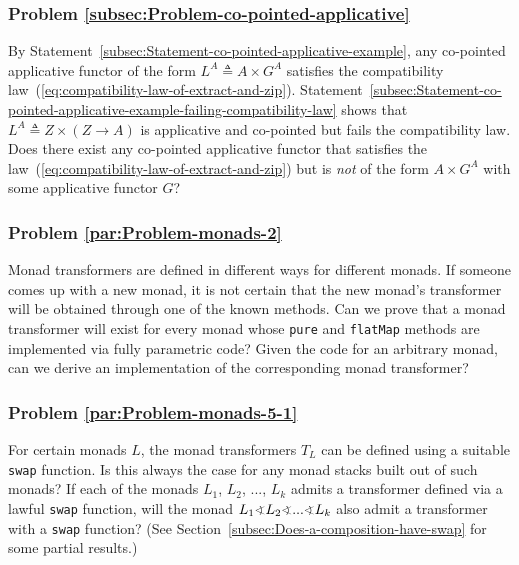 \subsubsection{Problem \label{subsec:Problem-co-pointed-applicative}\ref{subsec:Problem-co-pointed-applicative}}

By Statement~\ref{subsec:Statement-co-pointed-applicative-example},
any co-pointed applicative functor of the form $L^{A}\triangleq A\times G^{A}$
satisfies the compatibility law~(\ref{eq:compatibility-law-of-extract-and-zip}).
Statement~\ref{subsec:Statement-co-pointed-applicative-example-failing-compatibility-law}
shows that $L^{A}\triangleq Z\times\left(Z\rightarrow A\right)$ is
applicative and co-pointed but fails the compatibility law. Does there
exist any co-pointed applicative functor that satisfies the law~(\ref{eq:compatibility-law-of-extract-and-zip})
but is \emph{not} of the form $A\times G^{A}$ with some applicative
functor $G$? 

\subsubsection{Problem \label{par:Problem-monads-2}\ref{par:Problem-monads-2}}

Monad transformers are defined in different ways for different monads.
If someone comes up with a new monad, it is not certain that the new
monad\textsf{'}s transformer will be obtained through one of the known methods.
Can we prove that a monad transformer will exist for every monad whose
\lstinline!pure! and \lstinline!flatMap! methods are implemented
via fully parametric code? Given the code for an arbitrary monad,
can we derive an implementation of the corresponding monad transformer?

\subsubsection{Problem \label{par:Problem-monads-5-1}\ref{par:Problem-monads-5-1}}

For certain monads $L$, the monad transformers $T_{L}$ can be defined
using a suitable \lstinline!swap! function. Is this always the case
for any monad stacks built out of such monads? If each of the monads
$L_{1}$, $L_{2}$, ..., $L_{k}$ admits a transformer defined via
a lawful \lstinline!swap! function, will the monad $L_{1}\varangle L_{2}\varangle...\varangle L_{k}$
also admit a transformer with a \lstinline!swap! function? (See Section~\ref{subsec:Does-a-composition-have-swap}
for some partial results.)

